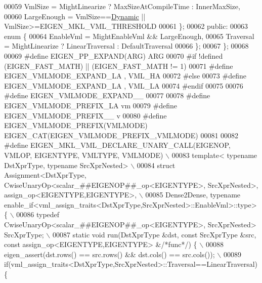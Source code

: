 \begin{DoxyCode}
00059       VmlSize = MightLinearize ? MaxSizeAtCompileTime : InnerMaxSize,
00060       LargeEnough = VmlSize==\hyperlink{namespace_eigen_ad81fa7195215a0ce30017dfac309f0b2}{Dynamic} || VmlSize>=EIGEN\_MKL\_VML\_THRESHOLD
00061     \};
00062   \textcolor{keyword}{public}:
00063     \textcolor{keyword}{enum} \{
00064       EnableVml = MightEnableVml && LargeEnough,
00065       Traversal = MightLinearize ? LinearTraversal : DefaultTraversal
00066     \};
00067 \};
00068 
00069 \textcolor{preprocessor}{#define EIGEN\_PP\_EXPAND(ARG) ARG}
00070 \textcolor{preprocessor}{#if !defined (EIGEN\_FAST\_MATH) || (EIGEN\_FAST\_MATH != 1)}
00071 \textcolor{preprocessor}{#define EIGEN\_VMLMODE\_EXPAND\_LA , VML\_HA}
00072 \textcolor{preprocessor}{#else}
00073 \textcolor{preprocessor}{#define EIGEN\_VMLMODE\_EXPAND\_LA , VML\_LA}
00074 \textcolor{preprocessor}{#endif}
00075 
00076 \textcolor{preprocessor}{#define EIGEN\_VMLMODE\_EXPAND\_\_ }
00077 
00078 \textcolor{preprocessor}{#define EIGEN\_VMLMODE\_PREFIX\_LA vm}
00079 \textcolor{preprocessor}{#define EIGEN\_VMLMODE\_PREFIX\_\_  v}
00080 \textcolor{preprocessor}{#define EIGEN\_VMLMODE\_PREFIX(VMLMODE) EIGEN\_CAT(EIGEN\_VMLMODE\_PREFIX\_,VMLMODE)}
00081 
00082 \textcolor{preprocessor}{#define EIGEN\_MKL\_VML\_DECLARE\_UNARY\_CALL(EIGENOP, VMLOP, EIGENTYPE, VMLTYPE, VMLMODE)                      
                           \(\backslash\)}
00083 \textcolor{preprocessor}{  template< typename DstXprType, typename SrcXprNested>                                                    
                           \(\backslash\)}
00084 \textcolor{preprocessor}{  struct Assignment<DstXprType, CwiseUnaryOp<scalar\_##EIGENOP##\_op<EIGENTYPE>, SrcXprNested>,
       assign\_op<EIGENTYPE,EIGENTYPE>,   \(\backslash\)}
00085 \textcolor{preprocessor}{                   Dense2Dense, typename
       enable\_if<vml\_assign\_traits<DstXprType,SrcXprNested>::EnableVml>::type> \{              \(\backslash\)}
00086 \textcolor{preprocessor}{    typedef CwiseUnaryOp<scalar\_##EIGENOP##\_op<EIGENTYPE>, SrcXprNested> SrcXprType;                       
                           \(\backslash\)}
00087 \textcolor{preprocessor}{    static void run(DstXprType &dst, const SrcXprType &src, const assign\_op<EIGENTYPE,EIGENTYPE> &}\textcolor{comment}{/*func*/}\textcolor{preprocessor}{)
       \{                   \(\backslash\)}
00088 \textcolor{preprocessor}{      eigen\_assert(dst.rows() == src.rows() && dst.cols() == src.cols());                                  
                           \(\backslash\)}
00089 \textcolor{preprocessor}{      if(vml\_assign\_traits<DstXprType,SrcXprNested>::Traversal==LinearTraversal) \{                         
}
\end{DoxyCode}
